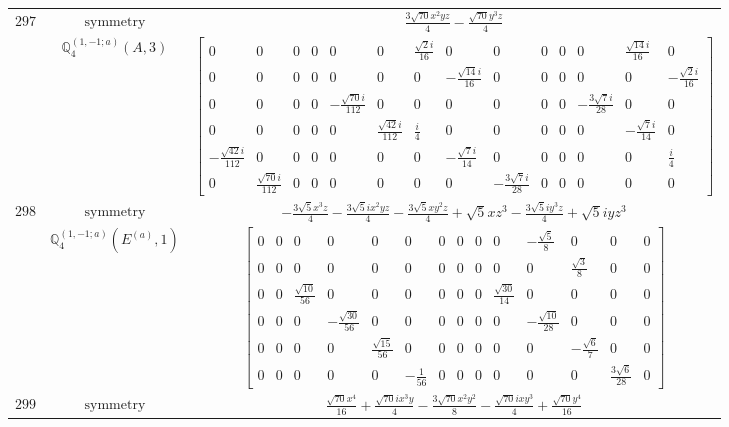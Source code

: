 \documentclass[fleqn,8pt,landscape]{jsarticle}
\begin{document}
\begin{longtable}{ccc}
$ 297 $ & $ \text{symmetry} $ & $ \frac{3 \sqrt{70} x^{2} y z}{4} - \frac{\sqrt{70} y^{3} z}{4} $ \\
$  $ & $ \mathbb{Q}_{4}^{(1,-1;a)}(A,3) $ & $ \begin{bmatrix} 0 & 0 & 0 & 0 & 0 & 0 & \frac{\sqrt{2} i}{16} & 0 & 0 & 0 & 0 & 0 & \frac{\sqrt{14} i}{16} & 0 \\ 0 & 0 & 0 & 0 & 0 & 0 & 0 & - \frac{\sqrt{14} i}{16} & 0 & 0 & 0 & 0 & 0 & - \frac{\sqrt{2} i}{16} \\ 0 & 0 & 0 & 0 & - \frac{\sqrt{70} i}{112} & 0 & 0 & 0 & 0 & 0 & 0 & - \frac{3 \sqrt{7} i}{28} & 0 & 0 \\ 0 & 0 & 0 & 0 & 0 & \frac{\sqrt{42} i}{112} & \frac{i}{4} & 0 & 0 & 0 & 0 & 0 & - \frac{\sqrt{7} i}{14} & 0 \\ - \frac{\sqrt{42} i}{112} & 0 & 0 & 0 & 0 & 0 & 0 & - \frac{\sqrt{7} i}{14} & 0 & 0 & 0 & 0 & 0 & \frac{i}{4} \\ 0 & \frac{\sqrt{70} i}{112} & 0 & 0 & 0 & 0 & 0 & 0 & - \frac{3 \sqrt{7} i}{28} & 0 & 0 & 0 & 0 & 0 \end{bmatrix} $ \\ \hline
$ 298 $ & $ \text{symmetry} $ & $ - \frac{3 \sqrt{5} x^{3} z}{4} - \frac{3 \sqrt{5} i x^{2} y z}{4} - \frac{3 \sqrt{5} x y^{2} z}{4} + \sqrt{5} x z^{3} - \frac{3 \sqrt{5} i y^{3} z}{4} + \sqrt{5} i y z^{3} $ \\
$  $ & $ \mathbb{Q}_{4}^{(1,-1;a)}(E^{(a)},1) $ & $ \begin{bmatrix} 0 & 0 & 0 & 0 & 0 & 0 & 0 & 0 & 0 & 0 & - \frac{\sqrt{5}}{8} & 0 & 0 & 0 \\ 0 & 0 & 0 & 0 & 0 & 0 & 0 & 0 & 0 & 0 & 0 & \frac{\sqrt{3}}{8} & 0 & 0 \\ 0 & 0 & \frac{\sqrt{10}}{56} & 0 & 0 & 0 & 0 & 0 & 0 & \frac{\sqrt{30}}{14} & 0 & 0 & 0 & 0 \\ 0 & 0 & 0 & - \frac{\sqrt{30}}{56} & 0 & 0 & 0 & 0 & 0 & 0 & - \frac{\sqrt{10}}{28} & 0 & 0 & 0 \\ 0 & 0 & 0 & 0 & \frac{\sqrt{15}}{56} & 0 & 0 & 0 & 0 & 0 & 0 & - \frac{\sqrt{6}}{7} & 0 & 0 \\ 0 & 0 & 0 & 0 & 0 & - \frac{1}{56} & 0 & 0 & 0 & 0 & 0 & 0 & \frac{3 \sqrt{6}}{28} & 0 \end{bmatrix} $ \\ \hline
$ 299 $ & $ \text{symmetry} $ & $ \frac{\sqrt{70} x^{4}}{16} + \frac{\sqrt{70} i x^{3} y}{4} - \frac{3 \sqrt{70} x^{2} y^{2}}{8} - \frac{\sqrt{70} i x y^{3}}{4} + \frac{\sqrt{70} y^{4}}{16} $ \\

\end{longtable}
\end{document}
